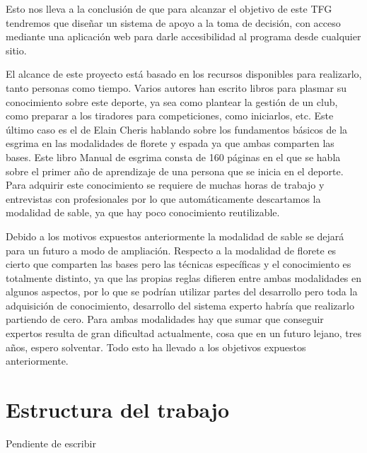 Esto nos lleva a la conclusión de que para alcanzar el objetivo de este TFG tendremos
 que diseñar un sistema de apoyo a la toma de decisión, con acceso mediante una aplicación
 web para darle accesibilidad al programa desde cualquier sitio.

El alcance de este proyecto está basado en los recursos disponibles para realizarlo, tanto personas como tiempo.
 Varios autores han escrito libros para plasmar su conocimiento sobre este deporte,
 ya sea como plantear la gestión de un club, como preparar a los tiradores para competiciones,
 como iniciarlos, etc. Este último caso es el de Elain Cheris hablando sobre los fundamentos
 básicos de la esgrima en las modalidades de florete y espada ya que ambas comparten
 las bases. Este libro Manual de esgrima consta de 160 páginas en el que se habla sobre
 el primer año de aprendizaje de una persona que se inicia en el deporte. Para adquirir
 este conocimiento se requiere de muchas horas de trabajo y entrevistas con profesionales
 por lo que automáticamente descartamos la modalidad de sable, ya que hay poco conocimiento
 reutilizable.

Debido a los motivos expuestos anteriormente la modalidad de sable se dejará para un futuro
 a modo de ampliación. Respecto a la modalidad de florete es cierto que comparten
 las bases pero las técnicas específicas y el conocimiento es totalmente distinto,
 ya que las propias reglas difieren entre ambas modalidades en algunos aspectos,
 por lo que se podrían utilizar partes del desarrollo pero toda la adquisición de
 conocimiento, desarrollo del sistema experto habría que realizarlo partiendo de cero.
 Para ambas modalidades hay que sumar que conseguir expertos resulta de gran dificultad
 actualmente, cosa que en un futuro lejano, tres años, espero solventar. Todo esto ha
 llevado a los objetivos expuestos anteriormente.

\section{Estructura del trabajo}

Pendiente de escribir
